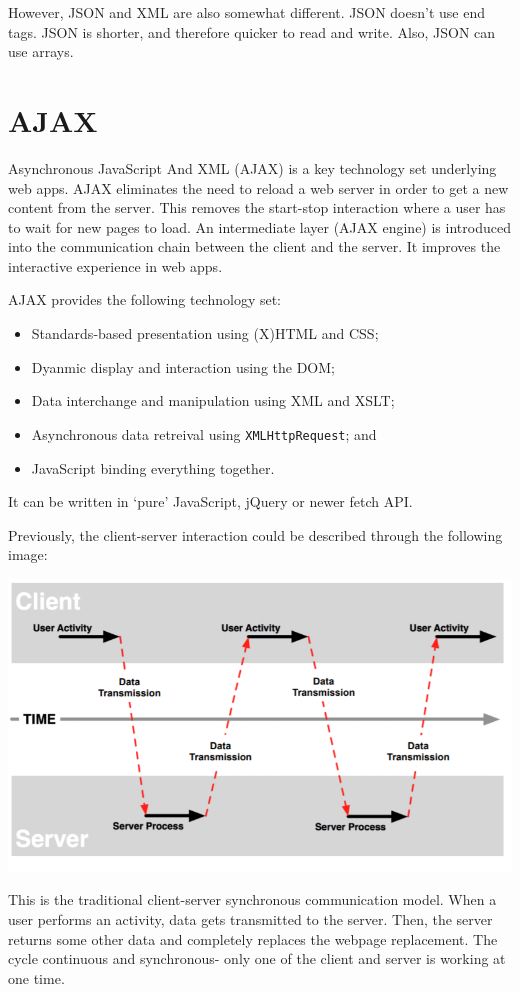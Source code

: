\documentclass[a4paper, openany]{memoir}
\begin{document}
\noindent However, JSON and XML are also somewhat different. JSON doesn't use end tags. JSON is shorter, and therefore quicker to read and write. Also, JSON can use arrays.
\newpage

\section{AJAX}
Asynchronous JavaScript And XML (AJAX) is a key technology set underlying web apps. AJAX eliminates the need to reload a web server in order to get a new content from the server. This removes the start-stop interaction where a user has to wait for new pages to load. An intermediate layer (AJAX engine) is introduced into the communication chain between the client and the server. It improves the interactive experience in web apps.

\noindent AJAX provides the following technology set:
\begin{itemize}
    \item Standards-based presentation using (X)HTML and CSS;
    \item Dyanmic display and interaction using the DOM;
    \item Data interchange and manipulation using XML and XSLT;
    \item Asynchronous data retreival using \texttt{XMLHttpRequest}; and
    \item JavaScript binding everything together.
\end{itemize}
It can be written in `pure' JavaScript, jQuery or newer fetch API.

\noindent Previously, the client-server interaction could be described through the following image:
\begin{center}
    \includegraphics[scale=0.5]{src/L16I1.PNG}
\end{center}
This is the traditional client-server synchronous communication model. When a user performs an activity, data gets transmitted to the server. Then, the server returns some other data and completely replaces the webpage replacement. The cycle continuous and synchronous- only one of the client and server is working at one time.
\end{document}
